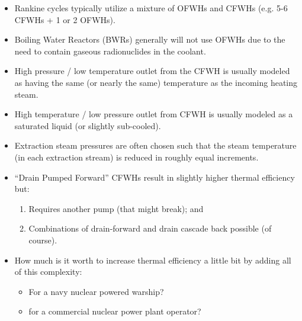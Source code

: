 \begin{itemize}
\item Rankine cycles typically utilize a mixture of OFWHs and CFWHs (e.g. 5-6 CFWHs + 1 or 2 OFWHs).  
\item Boiling Water Reactors (BWRs) generally will not use OFWHs due to the need to contain gaseous radionuclides in the coolant.  
\item High pressure / low temperature outlet from the CFWH is usually modeled as having the same (or nearly the same) temperature as the incoming heating steam.  
\item High temperature / low pressure outlet from CFWH is usually modeled as a saturated liquid (or slightly sub-cooled).
\item Extraction steam pressures are often chosen such that the steam temperature (in each extraction stream) is reduced in roughly equal increments.
\item ``Drain Pumped Forward'' CFWHs result in slightly higher thermal efficiency but:
\begin{enumerate}
\item Requires another pump (that might break); and
\item Combinations of drain-forward and drain cascade back possible (of course).
\end{enumerate}
\item How much is it worth to increase thermal efficiency a little bit by adding all of this complexity:
\begin{itemize}
\item For a navy nuclear powered warship?
\item for a commercial nuclear power plant operator?
\end{itemize}
\end{itemize} 

